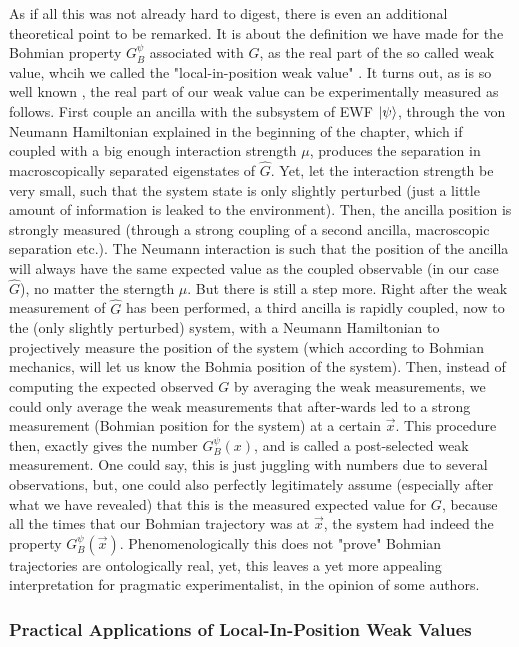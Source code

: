 \documentclass[11pt, a4paper]{article} %
\begin{document}
As if all this was not already hard to digest, there is even an additional theoretical point to be remarked. It is about the definition we have made for the Bohmian property $G_B^\psi$ associated with $G$, as the real part of the so called weak value, whcih we called the "local-in-position weak value" \cite{DevInPosition1, DevInPosition2}. It turns out, as is so well known \cite{Weak}, the real part of our weak value can be experimentally measured as follows. First couple an ancilla with the subsystem of EWF $\ket{\psi}$, through the von Neumann Hamiltonian explained in the beginning of the chapter, which if coupled with a big enough interaction strength $\mu$, produces the separation in macroscopically separated eigenstates of $\hat{G}$. Yet, let the interaction strength be very small, such that the system state is only slightly perturbed (just a little amount of information is leaked to the environment). Then, the ancilla position is strongly measured (through a strong coupling of a second ancilla, macroscopic separation etc.). The Neumann interaction is such that the position of the ancilla will always have the same expected value as the coupled observable (in our case $\hat{G}$), no matter the sterngth $\mu$. But there is still a step more. Right after the weak measurement of $\hat{G}$ has been performed, a third ancilla is rapidly coupled, now to the (only slightly perturbed) system, with a Neumann Hamiltonian to projectively measure the position of the system (which according to Bohmian mechanics, will let us know the Bohmia position of the system). Then, instead of computing the expected observed $G$ by averaging the weak measurements, we could only average the weak measurements that after-wards led to a strong measurement (Bohmian position for the system) at a certain $\vec{x}$. This procedure then, exactly gives the number $G^\psi_B(x)$, and is called a post-selected weak measurement. One could say, this is just juggling with numbers due to several observations, but, one could also perfectly legitimately assume (especially after what we have revealed) that this is the measured expected value for $G$, because all the times that our Bohmian trajectory was at $\vec{x}$, the system had indeed the property $G^\psi_B(\vec{x})$. Phenomenologically this does not "prove" Bohmian trajectories are ontologically real, yet, this leaves a yet more appealing interpretation for pragmatic experimentalist, in the opinion of some authors.

\subsubsection*{Practical Applications of Local-In-Position Weak Values}
\end{document}
